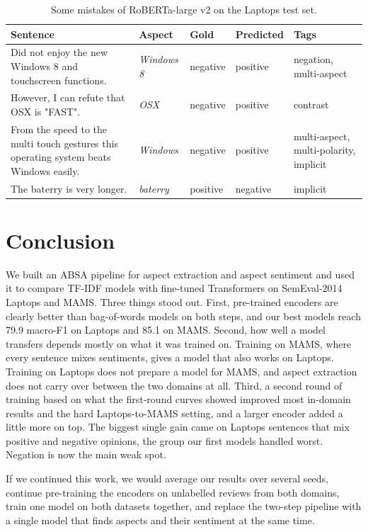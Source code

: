 \documentclass[11pt]{article}
\begin{document}
\begin{table}[t]
\centering
\footnotesize
\begin{tabular}{p{}p{}p{}p{}p{}}
\toprule
Sentence & Aspect & Gold & Predicted & Tags \\
\midrule
Did not enjoy the new Windows 8 and touchscreen functions. & \textit{Windows 8} & negative & positive & negation, multi-aspect \\
However, I can refute that OSX is "FAST". & \textit{OSX} & negative & positive & contrast \\
From the speed to the multi touch gestures this operating system beats Windows easily. & \textit{Windows} & negative & positive & multi-aspect, multi-polarity, implicit \\
The baterry is very longer. & \textit{baterry} & positive & negative & implicit \\
\bottomrule
\end{tabular}
\caption{Some mistakes of RoBERTa-large v2 on the Laptops test set.}
\label{tab:examples}
\end{table}

\section{Conclusion}
We built an ABSA pipeline for aspect extraction and aspect sentiment and used it to compare TF-IDF models with fine-tuned Transformers on SemEval-2014 Laptops and MAMS. Three things stood out. First, pre-trained encoders are clearly better than bag-of-words models on both steps, and our best models reach 79.9 macro-F1 on Laptops and 85.1 on MAMS. Second, how well a model transfers depends mostly on what it was trained on. Training on MAMS, where every sentence mixes sentiments, gives a model that also works on Laptops. Training on Laptops does not prepare a model for MAMS, and aspect extraction does not carry over between the two domains at all. Third, a second round of training based on what the first-round curves showed improved most in-domain results and the hard Laptops-to-MAMS setting, and a larger encoder added a little more on top. The biggest single gain came on Laptops sentences that mix positive and negative opinions, the group our first models handled worst. Negation is now the main weak spot.

If we continued this work, we would average our results over several seeds, continue pre-training the encoders on unlabelled reviews from both domains, train one model on both datasets together, and replace the two-step pipeline with a single model that finds aspects and their sentiment at the same time.
\end{document}
